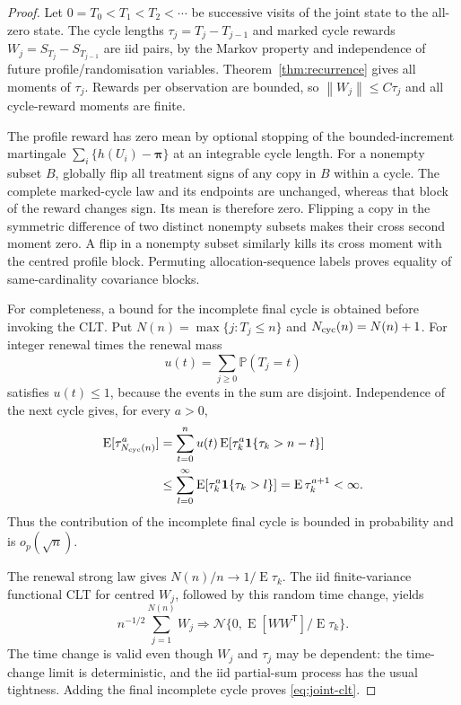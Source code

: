 \documentclass[12pt,a4paper]{article}
\theoremstyle{definition}
\theoremstyle{remark}\newtheorem{remark}{Remark}
\numberwithin{equation}{section}
\newcommand{\E}{\operatorname{E}}
\newcommand{\Pp}{\mathbb P}
\newcommand{\one}{\mathbf1}
\newcommand{\norm}[1]{\left\lVert#1\right\rVert}
\newcommand{\trans}{^{\mathsf T}}
\begin{document}
\begin{proof}
Let $0=T_0<T_1<T_2<\cdots$ be successive visits of the joint state to the all-zero state. The cycle lengths $\tau_j=T_j-T_{j-1}$ and marked cycle rewards $W_j=S_{T_j}-S_{T_{j-1}}$ are iid pairs, by the Markov property and independence of future profile/randomisation variables. Theorem~\ref{thm:recurrence} gives all moments of $\tau_j$. Rewards per observation are bounded, so $\norm{W_j}\le C\tau_j$ and all cycle-reward moments are finite.

The profile reward has zero mean by optional stopping of the bounded-increment martingale $\sum_i\{h(U_i)-\bm\pi\}$ at an integrable cycle length. For a nonempty subset $B$, globally flip all treatment signs of any copy in $B$ within a cycle. The complete marked-cycle law and its endpoints are unchanged, whereas that block of the reward changes sign. Its mean is therefore zero. Flipping a copy in the symmetric difference of two distinct nonempty subsets makes their cross second moment zero. A flip in a nonempty subset similarly kills its cross moment with the centred profile block. Permuting allocation-sequence labels proves equality of same-cardinality covariance blocks.

For completeness, a bound for the incomplete final cycle is obtained before invoking the CLT. Put $N(n)=\max\{j:T_j\le n\}$ and $N_{\rm cyc}(n)=N(n)+1$. For integer renewal times the renewal mass
\[
 u(t)=\sum_{j\ge0}\Pp(T_j=t)
\]
satisfies $u(t)\le1$, because the events in the sum are disjoint. Independence of the next cycle gives, for every $a>0$,
\begin{align}\label{eq:cover-moment}
 \E[\tau_{N_{\rm cyc}(n)}^a]
 &=\sum_{t=0}^n u(t)\E[\tau_k^a\one\{\tau_k>n-t\}]\\
 &\le\sum_{l=0}^{\infty}\E[\tau_k^a\one\{\tau_k>l\}]
 =\E\tau_k^{a+1}<\infty.\nonumber
\end{align}
Thus the contribution of the incomplete final cycle is bounded in probability and is $o_p(\sqrt n)$.

The renewal strong law gives $N(n)/n\to1/\E\tau_k$. The iid finite-variance functional CLT for centred $W_j$, followed by this random time change, yields
\[
 n^{-1/2}\sum_{j=1}^{N(n)}W_j\Rightarrow
 \mathcal N\{0,\E[WW\trans]/\E\tau_k\}.
\]
The time change is valid even though $W_j$ and $\tau_j$ may be dependent: the time-change limit is deterministic, and the iid partial-sum process has the usual tightness. Adding the final incomplete cycle proves \eqref{eq:joint-clt}.


\end{proof}
\end{document}
